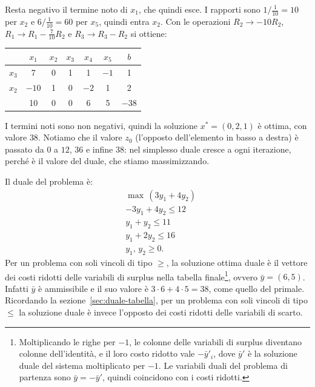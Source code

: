 Resta negativo il termine noto di $x_1$, che quindi esce. I rapporti sono $1 / \frac{1}{10} = 10$ per $x_2$ e $6 / \frac{1}{10} = 60$ per $x_5$, quindi entra $x_2$. Con le operazioni $R_2 \to -10R_2$, $R_1 \to R_1 - \frac{7}{10} R_2$ e $R_3 \to R_3 - R_2$ si ottiene:
\begin{center}
\begin{tabular}{c|ccccc|c}
 & $x_1$ & $x_2$ & $x_3$ & $x_4$ & $x_5$ & $b$ \\
\hline
$x_3$ & 7 & 0 & 1 & 1 & $-1$ & 1 \\
$x_2$ & $-10$ & 1 & 0 & $-2$ & 1 & 2 \\
\hline
 & 10 & 0 & 0 & 6 & 5 & $-38$ \\
\end{tabular}
\end{center}
I termini noti sono non negativi, quindi la soluzione $x^* = (0, 2, 1)$ è ottima, con valore $38$. Notiamo che il valore $z_0$ (l'opposto dell'elemento in basso a destra) è passato da $0$ a $12$, $36$ e infine $38$: nel simplesso duale cresce a ogni iterazione, perché è il valore del duale, che stiamo massimizzando.

Il duale del problema è:
\[
\begin{aligned}
&\max\, (3y_1 + 4y_2) \\
&{-3y_1} + 4y_2 \le 12 \\
&y_1 + y_2 \le 11 \\
&y_1 + 2y_2 \le 16 \\
&y_1,\, y_2 \ge 0.
\end{aligned}
\]
Per un problema con soli vincoli di tipo $\ge$, la soluzione ottima duale è il vettore dei costi ridotti delle variabili di surplus nella tabella finale\footnote{Moltiplicando le righe per $-1$, le colonne delle variabili di surplus diventano colonne dell'identità, e il loro costo ridotto vale $-\bar{y}'_i$, dove $\bar{y}'$ è la soluzione duale del sistema moltiplicato per $-1$. Le variabili duali del problema di partenza sono $\bar{y} = -\bar{y}'$, quindi coincidono con i costi ridotti.}, ovvero $\bar{y} = (6, 5)$. Infatti $\bar{y}$ è ammissibile e il suo valore è $3 \cdot 6 + 4 \cdot 5 = 38$, come quello del primale. Ricordando la sezione~\ref{sec:duale-tabella}, per un problema con soli vincoli di tipo $\le$ la soluzione duale è invece l'opposto dei costi ridotti delle variabili di scarto.

